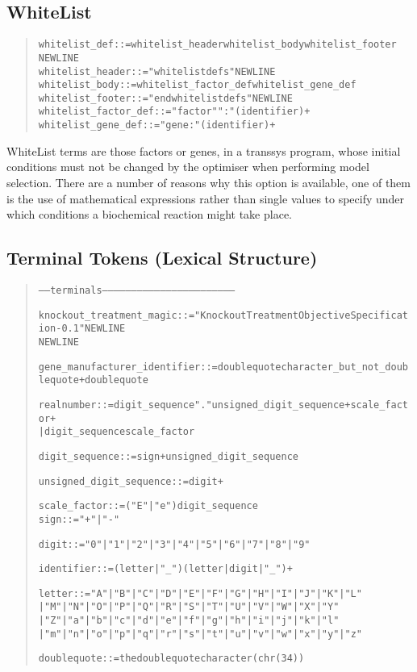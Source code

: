 \documentclass[a4paper,fleqn]{article}
\newenvironment{ebnfrule}{\begin{footnotesize}\begin{quote}\begin{alltt}}{\end{alltt}\end{quote}\end{footnotesize}}
\begin{document}
\subsection{WhiteList}

\begin{ebnfrule}
whitelist_def ::= whitelist_header whitelist_body whitelist_footer
NEWLINE
whitelist_header ::= "whitelistdefs" NEWLINE
whitelist_body ::= whitelist_factor_def whitelist_gene_def
whitelist_footer ::= "endwhitelistdefs" NEWLINE
whitelist_factor_def ::= "factor" ":" (identifier)+
whitelist_gene_def ::= "gene: " (identifier)+ 
\end{ebnfrule}

WhiteList terms are those factors or genes, in a transsys program, whose
initial conditions must not be changed by the optimiser when performing
model selection. There are a number of reasons why this option is available, 
one of them is the use of mathematical expressions rather than single values
to specify under which conditions a biochemical reaction might take place.

\subsection{Terminal Tokens (Lexical Structure)}

\begin{ebnfrule}
----- terminals --------------------------------------------------------------------

knockout_treatment_magic ::= "KnockoutTreatmentObjectiveSpecification-0.1" NEWLINE
NEWLINE

gene_manufacturer_identifier ::= doublequote character_but_not_doublequote+ doublequote

realnumber ::= digit_sequence "." unsigned_digit_sequence+ scale_factor+
                | digit_sequence scale_factor

digit_sequence ::= sign+ unsigned_digit_sequence

unsigned_digit_sequence ::= digit+


scale_factor ::= ("E" | "e") digit_sequence
sign ::=  "+" | "-"


digit ::= "0" | "1" | "2" | "3" | "4" | "5" | "6" | "7" | "8" | "9"

identifier ::= (letter | "_") (letter | digit | "_")+

letter ::= "A" | "B" | "C" | "D" | "E" | "F" | "G" | "H" | "I" | "J" | "K"| "L" 
| "M" | "N" | "O" | "P" | "Q" | "R" | "S" | "T" | "U" | "V" | "W"| "X" | "Y" 
| "Z"| "a" | "b" | "c" | "d" | "e" | "f" | "g" | "h" | "i" | "j" | "k"| "l" 
| "m" | "n" | "o" | "p" | "q" | "r" | "s" | "t" | "u" | "v" | "w" | "x" | "y" | "z"

doublequote ::= the doublequote character (chr(34))
\end{ebnfrule}


\end{document}
